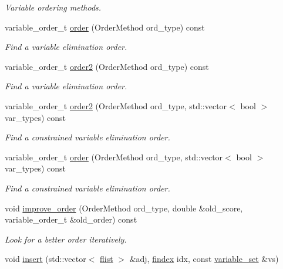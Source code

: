 \begin{DoxyCompactItemize}
\begin{DoxyCompactList}\small\item\em Variable ordering methods. \end{DoxyCompactList}\item 
variable\+\_\+order\+\_\+t \hyperlink{classmerlin_1_1graphical__model_a90bcf3fb02f0f43bf57520e834875c78}{order} (Order\+Method ord\+\_\+type) const 
\begin{DoxyCompactList}\small\item\em Find a variable elimination order. \end{DoxyCompactList}\item 
variable\+\_\+order\+\_\+t \hyperlink{classmerlin_1_1graphical__model_aaed0e52114f9dc66f14126280cf6b68e}{order2} (Order\+Method ord\+\_\+type) const 
\begin{DoxyCompactList}\small\item\em Find a variable elimination order. \end{DoxyCompactList}\item 
variable\+\_\+order\+\_\+t \hyperlink{classmerlin_1_1graphical__model_a46a0f34fa6a0d021a2ae3161da271feb}{order2} (Order\+Method ord\+\_\+type, std\+::vector$<$ bool $>$ var\+\_\+types) const 
\begin{DoxyCompactList}\small\item\em Find a constrained variable elimination order. \end{DoxyCompactList}\item 
variable\+\_\+order\+\_\+t \hyperlink{classmerlin_1_1graphical__model_a8a722099188b11d7e44b668c13e836f2}{order} (Order\+Method ord\+\_\+type, std\+::vector$<$ bool $>$ var\+\_\+types) const 
\begin{DoxyCompactList}\small\item\em Find a constrained variable elimination order. \end{DoxyCompactList}\item 
void \hyperlink{classmerlin_1_1graphical__model_a42f9b6f295100feefaaec09cef03c173}{improve\+\_\+order} (Order\+Method ord\+\_\+type, double \&old\+\_\+score, variable\+\_\+order\+\_\+t \&old\+\_\+order) const 
\begin{DoxyCompactList}\small\item\em Look for a better order iteratively. \end{DoxyCompactList}\item 
void \hyperlink{classmerlin_1_1graphical__model_aa953b05dcb91b18c8726324bcbe7eb24}{insert} (std\+::vector$<$ \hyperlink{classmerlin_1_1graphical__model_a615e25ec6594615fddfd4c3c4776b99f}{flist} $>$ \&adj, \hyperlink{classmerlin_1_1graphical__model_ab2b46f09d8142bb68f243ecadbdabb6b}{findex} idx, const \hyperlink{classmerlin_1_1variable__set}{variable\+\_\+set} \&vs)

\end{DoxyCompactItemize}
